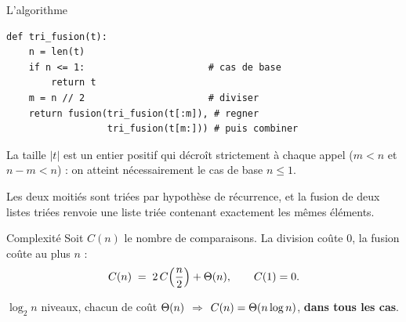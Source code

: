 \documentclass[11pt,aspectratio=169]{beamer}
\begin{document}
\begin{frame}[fragile]{L'algorithme}
\begin{lstlisting}
def tri_fusion(t):
    n = len(t)
    if n <= 1:                      # cas de base
        return t
    m = n // 2                      # diviser
    return fusion(tri_fusion(t[:m]), # regner
                  tri_fusion(t[m:])) # puis combiner
\end{lstlisting}
\vspace{2pt}
\begin{terminaisonrec}
La taille $|t|$ est un entier positif qui décroît strictement à chaque appel
($m<n$ et $n-m<n$) : on atteint nécessairement le cas de base $n\le1$.
\end{terminaisonrec}
\begin{correction}
\small
Les deux moitiés sont triées par hypothèse de récurrence, et la fusion de deux listes
triées renvoie une liste triée contenant exactement les mêmes éléments.
\end{correction}
\end{frame}

\begin{frame}{Complexité}
Soit $C(n)$ le nombre de comparaisons. La division coûte $0$, la fusion coûte au plus $n$ :
\[
C(n)\;=\;2\,C\!\left(\frac n2\right)+\Theta(n),\qquad C(1)=0 .
\]
\vspace{-6pt}
\begin{center}
\end{center}
\vspace{-2pt}
\begin{encadre}
\centering
$\log_2 n$ niveaux, chacun de coût $\Theta(n)$ \;$\Longrightarrow$\;
$C(n)=\Theta(n\log n)$, \textbf{dans tous les cas}.
\end{encadre}
\end{frame}
\end{document}
